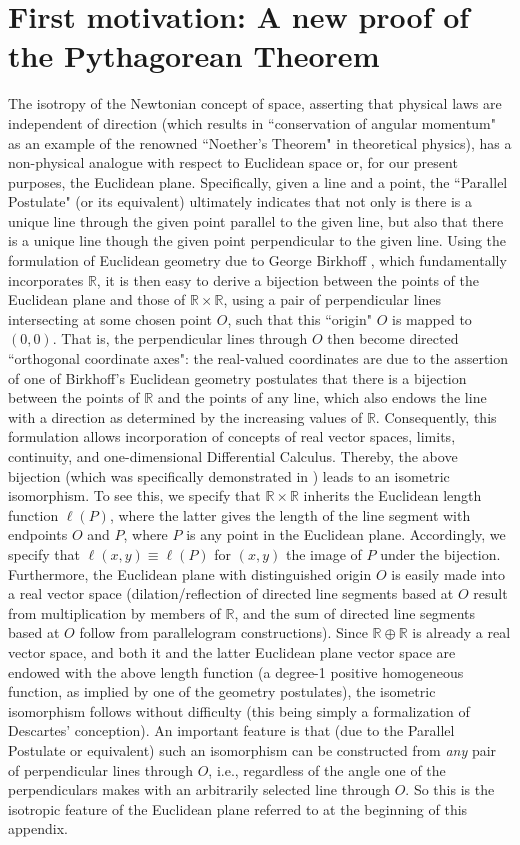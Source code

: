 \documentclass{amsart}
\numberwithin{equation}{section}
\theoremstyle{definition}
\numberwithin{theorem}{section}
\begin{document}
 \section{First motivation: A  new proof of the Pythagorean Theorem}    The isotropy of the Newtonian concept of space, asserting that physical laws are independent of direction (which results in ``conservation of angular momentum" as an example of the renowned ``Noether's Theorem" in theoretical physics), has a non-physical analogue with respect to Euclidean space or, for our present purposes, the Euclidean plane.  Specifically, given a line and a point, the ``Parallel Postulate" (or its equivalent) ultimately indicates that not only is there is a unique line through the given point parallel to the given line, but also that there is a unique line though the given point perpendicular to the given line.  Using the formulation of Euclidean geometry due to George Birkhoff \cite{birkhoff:1932}, which fundamentally incorporates $\mathbb{R}$, it is then easy to derive a bijection between the points of the Euclidean plane and those of $\mathbb{R}\times\mathbb{R}$, using a pair of perpendicular lines intersecting at some chosen point $O$, such that this ``origin" $O$ is mapped to $(0,0)$.  That is, the perpendicular lines through $O$ then become directed ``orthogonal coordinate axes": the real-valued coordinates are due to the assertion of one of Birkhoff's Euclidean geometry postulates that there is a bijection between the points of $\mathbb{R}$ and the points of any line, which also endows the line with a direction as determined by the increasing values of $\mathbb{R}$.  Consequently, this formulation allows incorporation of concepts of real vector spaces, limits, continuity, and one-dimensional Differential Calculus.  Thereby, the above bijection (which was specifically demonstrated in \cite{birkhoff:1932}) leads to an isometric isomorphism. 
To see this, we specify that $\mathbb{R}\times\mathbb{R}$  inherits the Euclidean length function $\ell(P)$, where the latter gives the length of the line segment with endpoints $O$ and $P$, where $P$ is  any point in the Euclidean plane.  Accordingly, we specify that $\ell(x,y) \equiv \ell(P)$ for $(x,y)$ the image of $P$ under the bijection.  Furthermore, the Euclidean plane with distinguished origin $O$ is easily made into a real vector space (dilation/reflection of directed line segments based at $O$ result from multiplication by members of $\mathbb{R}$, and the sum of directed line segments based at $O$ follow from parallelogram constructions).   Since $\mathbb{R}\oplus\mathbb{R}$ is already a real vector space, and both it and the latter Euclidean plane vector space are endowed with the above length function (a degree-1 positive homogeneous function, as implied by one of the geometry postulates), the isometric isomorphism follows without difficulty (this being simply a formalization of Descartes' conception).  An important feature is that (due to the Parallel Postulate or equivalent) such an isomorphism can be constructed from {\it any} pair of perpendicular lines through $O$, i.e., regardless of the angle one of the perpendiculars makes with an arbitrarily selected line through $O$.  So this is the isotropic feature of the Euclidean plane referred to at the beginning of this appendix.    
 
\end{document}
